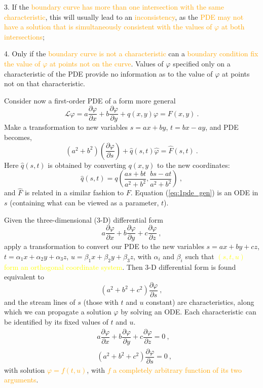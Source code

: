 \documentclass[12pt,a4paper]{article}
\begin{document}
3. If the \textcolor{orange}{boundary curve has more than one intersection with the same characteristic}, this will usually lead to an \textcolor{orange}{inconsistency}, as the \textcolor{orange}{PDE may not have a solution that is simultaneously consistent with the values of $\varphi$ at both intersections};

4. Only if the \textcolor{orange}{boundary curve is not a characteristic} can a \textcolor{orange}{boundary condition fix the value of $\varphi$ at points not on the curve}. Values of $\varphi$ specified only on a characteristic of the PDE provide no information as to the value of $\varphi$ at points not on that characteristic.

Consider now a first-order PDE of a form more general 
\begin{equation}
\mathcal L \varphi = a \dfrac{\partial \varphi}{\partial x} + b\dfrac{\partial \varphi}{\partial y} +q(x,y) \varphi = F(x,y) ~.
\end{equation}
Make a transformation to new variables $s = ax + by$, $t = bx -ay$, and PDE becomes,
\begin{equation}
(a^2 +b^2) \left(\dfrac{\partial \varphi}{\partial s} \right) +\hat{q}(s,t) \hat{\varphi} = \hat{F}(s,t) ~.
\label{eq:1pde_gen}
\end{equation}
Here $\hat{q}(s,t)$ is obtained by converting $q(x, y)$ to the new coordinates:
\begin{equation}
\hat{q}(s,t) = q\left(\dfrac{as +bt}{a^2 +b^2}, \dfrac{bs -at}{a^2 +b^2} \right) ~,
\end{equation}
and $\hat{F}$ is related in a similar fashion to $F$. Equation (\ref{eq:1pde_gen}) is an ODE in $s$ (containing what can be viewed as a parameter, $t$).


Given the three-dimensional ($3$-D) differential form
\begin{equation}
a \dfrac{\partial \varphi}{\partial x} + b\dfrac{\partial \varphi}{\partial y} +c\dfrac{\partial \varphi}{\partial z} ~,
\end{equation}
apply a transformation to convert our PDE to the new variables $s = ax + by + cz$, $t=\alpha_1 x+\alpha_2 y+\alpha_3 z$, $u=\beta_1 x+\beta_2 y+\beta_3z$, with $\alpha_i$ and $\beta_i$ such that \textcolor{yellow}{$(s,t,u)$ form an orthogonal coordinate system}. Then $3$-D differential form is found equivalent to
\begin{equation}
(a^2 +b^2 +c^2) \dfrac{\partial \varphi}{\partial s} ~,
\end{equation}
and the stream lines of $s$ (those with $t$ and $u$ constant) are characteristics, along which we can propagate a solution $\varphi$ by solving an ODE. Each characteristic can be identified by its fixed values of $t$ and $u$. 
\begin{align}
\label{eq:1pde_3}
& a \dfrac{\partial \varphi}{\partial x} + b\dfrac{\partial \varphi}{\partial y} +c\dfrac{\partial \varphi}{\partial z} = 0 ~, \\
& (a^2 +b^2 +c^2) \dfrac{\partial \varphi}{\partial s} =  0 ~,
\end{align}
with solution \textcolor{orange}{$\varphi = f(t, u)$}, with \textcolor{orange}{$f$ a completely arbitrary function of its two arguments}.
\end{document}
